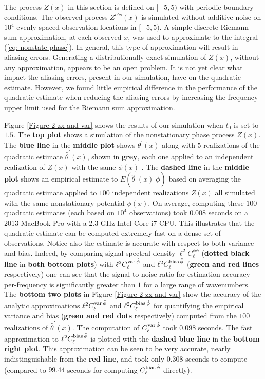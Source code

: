 \documentclass[10pt,noinfoline]{imsart}
\begin{document}
The process $Z(x)$ in this section is defined on $[-5,5)$ with periodic boundary conditions. 
The observed process $Z^{obs}(x)$ is simulated without additive noise on $10^4$ evenly spaced observation locations in $[-5,5)$.  A simple discrete Riemann sum approximation, at each observed $x$, was used to approximate to the integral (\ref{eq: nonstate phase}). In general, this type of approximation will result in aliasing errors. Generating a distributionally exact simulation of $Z(x)$, without any approximation, appears to be an open problem.   It is not yet clear what impact the aliasing errors, present in our simulation, have on the quadratic estimate. However, we found little empirical difference in the performance of the quadratic estimate when reducing the aliasing errors by increasing the frequency upper limit used for the Riemann sum approximation. 





Figure \ref{Figure 2 zx and var} shows the results of our simulation when $t_0$ is set to $1.5$. The \textbf{top plot} shows a simulation of the nonstationary phase process $Z(x)$. The \textbf{blue line} in the \textbf{middle plot} shows $\theta^\prime(x)$ along with $5$ realizations of the quadratic estimate $\hat\theta^\prime(x)$, shown in \textbf{grey}, each one applied to an independent realization of $Z(x)$ with the same $\phi(x)$ . The \textbf{dashed line} in the \textbf{middle plot} shows an empirical estimate to $E(\hat\theta^\prime(x)|\phi)$ based on averaging the quadratic estimate applied to $100$ independent realizations $Z(x)$ all simulated with the same nonstationary potential $\phi(x)$. On average, computing these $100$ quadratic estimates (each based on $10^4$ observations) took $0.008$ seconds on a 2013 MacBook Pro with a 2.3 GHz Intel Core i7 CPU. This illustrates that the quadratic estimate can be computed extremely fast on a dense set of observations. Notice also the estimate is accurate with respect to both variance and bias. Indeed, by comparing signal spectral density $\ell^2 C_\ell^{\phi\phi}$ (\textbf{dotted black line} in \textbf{both bottom plots})  with  $\ell^2 C^{\text{var\,}\hat\phi}_{\ell}$ and $\ell^2 C^{\text{bias\,}\hat\phi}_{\ell}$  (\textbf{green and red lines} respectively) one can see that the signal-to-noise ratio for estimation accuracy per-frequency is significantly greater than $1$ for a large range of wavenumbers. The \textbf{bottom two plots} in Figure \ref{Figure 2 zx and var} show the accuracy of the analytic approximations $\ell^2 C^{\text{var\,}\hat\phi}_{\ell}$ and  $\ell^2 C^{\text{bias\,}\hat\phi}_{\ell}$ for quantifying the empirical variance and bias (\textbf{green and red dots} respectively) computed from the $100$ realizations of $\hat\theta^\prime(x)$. The computation of $C^{\text{var\,}\hat\phi}_{\ell}$ took $0.098$ seconds. The fast approximation to  $\ell^2 C^{\text{bias\,}\hat\phi}_{\ell}$ is plotted with the \textbf{dashed blue line} in the \textbf{bottom right plot}. This approximation can be seen to be very accurate, nearly indistinguishable from the \textbf{red line}, and took only $0.308$ seconds to compute (compared to $99.44$ seconds for computing  $C^{\text{bias\,}\hat\phi}_{\ell}$ directly).
\end{document}
